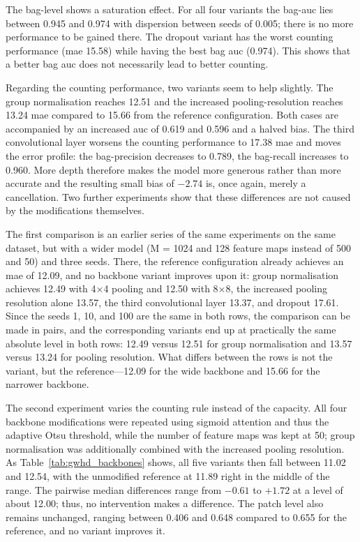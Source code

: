 \documentclass[12pt,parskip = half, DIV=classic,listof=totoc]{scrartcl}
\begin{document}
			The bag-level shows a saturation effect. For all four variants the bag-\acs*{auc} lies between 0.945 and 0.974 with dispersion between seeds of 0.005; there
			is no more performance to be gained there. The dropout variant has the worst counting performance (\ac{mae} 15.58) while having 
			the best bag \acs*{auc} (0.974). This shows that a better bag \ac{auc} does not necessarily lead to better counting.

			Regarding the counting performance, two variants seem to help slightly. The group normalisation reaches 12.51 and the increased pooling-resolution
			reaches 13.24 \ac{mae} compared to 15.66 from the reference configuration. Both cases are accompanied by an increased \ac{auc} of 0.619 and 0.596 and a halved bias.
			The third convolutional layer worsens the counting performance to 17.38 \ac{mae} and moves the error profile: the bag-precision decreases to 0.789, the
			bag-recall increases to 0.960. More depth therefore makes the model more generous rather than more accurate and the resulting small bias
			of $-2.74$ is, once again, merely a cancellation. Two further experiments show that these differences are not caused by the modifications themselves.

			The first comparison is an earlier series of the same experiments on the same
			dataset, but with a wider model (M = 1024 and 128 feature maps instead of
			500 and 50) and three seeds. There, the reference configuration already achieves an
			\ac{mae} of 12.09, and no backbone variant improves upon it:
			group normalisation achieves 12.49 with 4×4 pooling and 12.50 with 8×8, the
			increased pooling resolution alone 13.57, the third convolutional layer 13.37, and
			dropout 17.61. Since the seeds 1, 10, and 100 are the same in both rows,
			the comparison can be made in pairs, and the corresponding variants end up at
			practically the same absolute level in both rows: 12.49 versus 12.51 for
			group normalisation and 13.57 versus 13.24 for pooling resolution.
			What differs between the rows is not the variant, but the
			reference—12.09 for the wide backbone and 15.66 for the narrower backbone.
			
			The second experiment varies the counting rule instead of the capacity. All four
			backbone modifications were repeated using sigmoid attention and thus the adaptive
			Otsu threshold, while the number of feature maps was kept at 50;
			group normalisation was additionally combined with the increased
			pooling resolution. As Table~\ref{tab:gwhd_backbones} shows, all five
			variants then fall between 11.02 and 12.54, with the unmodified reference at 11.89
			right in the middle of the range. The pairwise median differences range from $-0.61$ to $+1.72$ at
			a level of about 12.00; thus, no intervention makes a difference. The patch level
			also remains unchanged, ranging between 0.406 and 0.648 compared to 0.655 for the reference,
			and no variant improves it.
			
\end{document}
